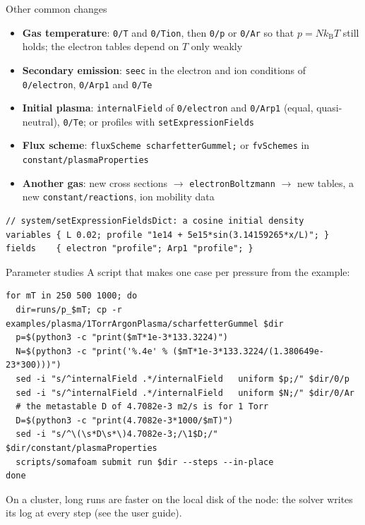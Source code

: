 \documentclass[aspectratio=169,11pt]{beamer}
\newcommand{\kw}[1]{\texttt{#1}}
\begin{document}
\begin{frame}[fragile]{Other common changes}
  \begin{itemize}
    \item \textbf{Gas temperature}: \kw{0/T} and \kw{0/Tion}, then \kw{0/p} or \kw{0/Ar}
          so that $p=Nk_\mathrm{B}T$ still holds; the electron tables depend on $T$ only weakly
    \item \textbf{Secondary emission}: \kw{seec} in the electron and ion conditions of
          \kw{0/electron}, \kw{0/Arp1} and \kw{0/Te}
    \item \textbf{Initial plasma}: \kw{internalField} of \kw{0/electron} and \kw{0/Arp1}
          (equal, quasi-neutral), \kw{0/Te}; or profiles with \kw{setExpressionFields}
    \item \textbf{Flux scheme}: \kw{fluxScheme scharfetterGummel;} or \kw{fvSchemes} in
          \kw{constant/plasmaProperties}
    \item \textbf{Another gas}: new cross sections $\rightarrow$ \kw{electronBoltzmann}
          $\rightarrow$ new tables, a new \kw{constant/reactions}, ion mobility data
  \end{itemize}
  \begin{lstlisting}
// system/setExpressionFieldsDict: a cosine initial density
variables { L 0.02; profile "1e14 + 5e15*sin(3.14159265*x/L)"; }
fields    { electron "profile"; Arp1 "profile"; }
  \end{lstlisting}
\end{frame}

\begin{frame}[fragile]{Parameter studies}
  A script that makes one case per pressure from the example:
  \begin{lstlisting}
for mT in 250 500 1000; do
  dir=runs/p_$mT; cp -r examples/plasma/1TorrArgonPlasma/scharfetterGummel $dir
  p=$(python3 -c "print($mT*1e-3*133.3224)")
  N=$(python3 -c "print('%.4e' % ($mT*1e-3*133.3224/(1.380649e-23*300)))")
  sed -i "s/^internalField .*/internalField   uniform $p;/" $dir/0/p
  sed -i "s/^internalField .*/internalField   uniform $N;/" $dir/0/Ar
  # the metastable D of 4.7082e-3 m2/s is for 1 Torr
  D=$(python3 -c "print(4.7082e-3*1000/$mT)")
  sed -i "s/^\(\s*D\s*\)4.7082e-3;/\1$D;/" $dir/constant/plasmaProperties
  scripts/somafoam submit run $dir --steps --in-place
done
  \end{lstlisting}
  \small On a cluster, long runs are faster on the local disk of the node: the solver
  writes its log at every step (see the user guide).
\end{frame}
\end{document}
